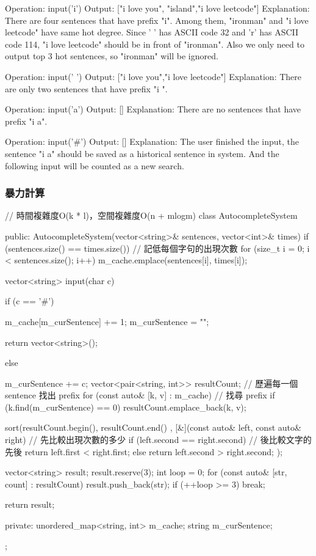 Operation: input('i')
Output: ["i love you", "island","i love leetcode"]
Explanation:
There are four sentences that have prefix "i". Among them, "ironman" and "i love leetcode" have same hot degree. Since ' ' has ASCII code 32 and 'r' has ASCII code 114, "i love leetcode" should be in front of "ironman". Also we only need to output top 3 hot sentences, so "ironman" will be ignored.

Operation: input(' ')
Output: ["i love you","i love leetcode"]
Explanation:
There are only two sentences that have prefix "i ".

Operation: input('a')
Output: []
Explanation:
There are no sentences that have prefix "i a".

Operation: input('\#')
Output: []
Explanation:
The user finished the input, the sentence "i a" should be saved as a historical sentence in system. And the following input will be counted as a new search.

\subsubsection{暴力計算}
\begin{Code}
// 時間複雜度O(k * l)，空間複雜度O(n + mlogm)
class AutocompleteSystem {
public:
    AutocompleteSystem(vector<string>& sentences, vector<int>& times) {
        if (sentences.size() == times.size())
        {
            // 記低每個字句的出現次數
            for (size_t i = 0; i < sentences.size(); i++)
                m_cache.emplace(sentences[i], times[i]);
        }
    }

    vector<string> input(char c) {
        if (c == '#')
        {
            m_cache[m_curSentence] += 1;
            m_curSentence = "";

            return vector<string>();
        }
        else
        {
            m_curSentence += c;
            vector<pair<string, int>> resultCount;
            // 歷遍每一個 sentence 找出 prefix
            for (const auto& [k, v] : m_cache)
            {
                // 找尋 prefix
                if (k.find(m_curSentence) == 0)
                {
                    resultCount.emplace_back(k, v);
                }
            }

            sort(resultCount.begin(), resultCount.end()
                 , [&](const auto& left, const auto& right)
                 {
                     // 先比較出現次數的多少
                     if (left.second == right.second)
                     {
                         // 後比較文字的先後
                         return left.first < right.first;
                     }
                     else
                         return left.second > right.second;
                 });

            vector<string> result; result.reserve(3);
            int loop = 0;
            for (const auto& [str, count] : resultCount)
            {
                result.push_back(str);
                if (++loop >= 3) break;
            }

            return result;
        }
    }
private:
    unordered_map<string, int> m_cache;
    string m_curSentence;
};
\end{Code}
